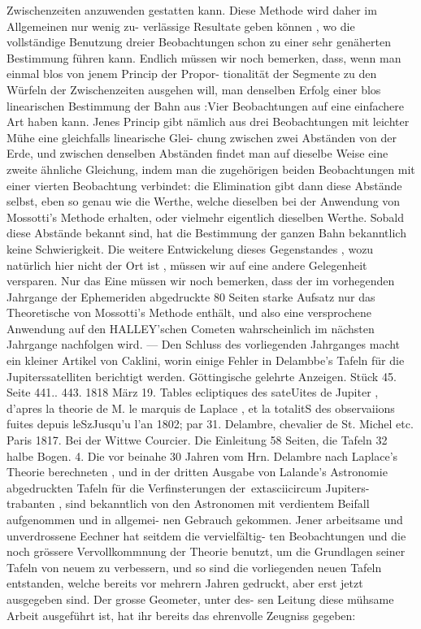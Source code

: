 \documentclass[12pt,a4paper]{article}
\begin{document}
{{{{{{{Zwischenzeiten  anzuwenden  gestatten  kann.  Diese  Methode  wird  daher  im  Allgemeinen  nur  wenig  zu- verlässige Resultate  geben  können ,  wo  die  vollständige  Benutzung  dreier  Beobachtungen  schon  zu  einer sehr  genäherten  Bestimmung  führen  kann. Endlich  müssen  wir  noch  bemerken,  dass,  wenn  man  einmal  blos  von  jenem  Princip  der  Propor- tionalität der  Segmente  zu  den  Würfeln  der  Zwischenzeiten  ausgehen  will,  man  denselben  Erfolg  einer blos  linearischen  Bestimmung  der  Bahn  aus  :Vier  Beobachtungen  auf  eine  einfachere  Art  haben  kann. Jenes  Princip  gibt  nämlich  aus  drei  Beobachtungen  mit  leichter  Mühe  eine  gleichfalls  linearische  Glei- chung zwischen  zwei  Abständen  von  der  Erde,  und  zwischen  denselben  Abständen  findet  man  auf dieselbe  Weise  eine  zweite  ähnliche  Gleichung,  indem  man  die  zugehörigen  beiden  Beobachtungen  mit einer  vierten  Beobachtung  verbindet:  die  Elimination  gibt  dann  diese  Abstände  selbst,  eben  so  genau wie  die  Werthe,  welche  dieselben  bei  der  Anwendung  von  Mossotti's  Methode  erhalten,  oder  vielmehr eigentlich  dieselben  Werthe.  Sobald  diese  Abstände  bekannt  sind,  hat  die  Bestimmung  der  ganzen Bahn  bekanntlich  keine  Schwierigkeit.  Die  weitere  Entwickelung  dieses  Gegenstandes ,  wozu  natürlich hier  nicht  der  Ort  ist ,  müssen  wir  auf  eine  andere  Gelegenheit  versparen.  Nur  das  Eine  müssen  wir noch  bemerken,  dass  der  im  vorhegenden  Jahrgange  der  Ephemeriden  abgedruckte  80  Seiten  starke Aufsatz  nur  das  Theoretische  von  Mossotti's  Methode  enthält,  und  also  eine  versprochene  Anwendung auf  den  HALLEY'schen  Cometen  wahrscheinlich  im  nächsten  Jahrgange  nachfolgen  wird.  ---  Den  Schluss des  vorliegenden  Jahrganges  macht  ein  kleiner  Artikel  von  Caklini,  worin  einige  Fehler  in  Delambbe's Tafeln  für  die  Jupiterssatelliten  berichtigt  werden. Göttingische  gelehrte  Anzeigen.     Stück  45.     Seite  441.. 443.     1818  März  19. Tables  ecliptiques  des  sateUites  de  Jupiter ,  d'apres  la  theorie  de  M.  le  marquis  de  Laplace  ,  et  la totalitS  des  observaiions  fuites  depuis  leSzJusqu'u  l'an  1802;  par  31.  Delambre,  chevalier  de  St.  Michel  etc. Paris  1817.     Bei  der  Wittwe  Courcier.    Die  Einleitung  58  Seiten,  die  Tafeln  32  halbe  Bogen.    4. Die  vor  beinahe  30  Jahren  vom  Hrn.  Delambre  nach  Laplace's  Theorie  berechneten ,  und  in  der dritten  Ausgabe  von  Lalande's  Astronomie  abgedruckten  Tafeln  für  die  Verfinsterungen  der\	extasciicircum{}{ }Jupiters- trabanten ,  sind  bekanntlich  von  den  Astronomen  mit  verdientem  Beifall  aufgenommen  und  in  allgemei- nen Gebrauch  gekommen.  Jener  arbeitsame  und  unverdrossene  Eechner  hat  seitdem  die  vervielfältig- ten Beobachtungen  und  die  noch  grössere  Vervollkommnung  der  Theorie  benutzt,  um  die  Grundlagen seiner  Tafeln  von  neuem  zu  verbessern,  und  so  sind  die  vorliegenden  neuen  Tafeln  entstanden,  welche bereits  vor  mehrern  Jahren  gedruckt,  aber  erst  jetzt  ausgegeben  sind.  Der  grosse  Geometer,  unter  des- sen Leitung  diese  mühsame  Arbeit  ausgeführt  ist,  hat  ihr  bereits  das  ehrenvolle  Zeugniss  gegeben: }}}}}}}
\end{document}
